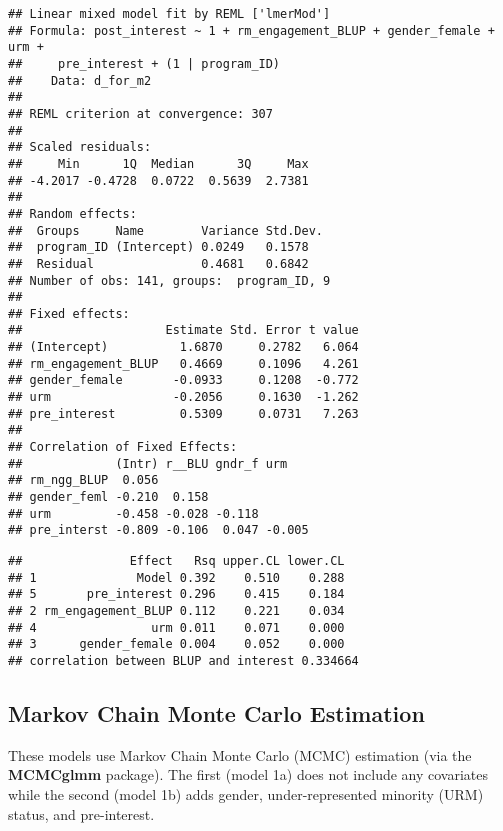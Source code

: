 \documentclass[man]{apa6}
\theoremstyle{definition}
\theoremstyle{definition}
\theoremstyle{definition}
\theoremstyle{remark}
\begin{document}
\begin{verbatim}
## Linear mixed model fit by REML ['lmerMod']
## Formula: post_interest ~ 1 + rm_engagement_BLUP + gender_female + urm +  
##     pre_interest + (1 | program_ID)
##    Data: d_for_m2
## 
## REML criterion at convergence: 307
## 
## Scaled residuals: 
##     Min      1Q  Median      3Q     Max 
## -4.2017 -0.4728  0.0722  0.5639  2.7381 
## 
## Random effects:
##  Groups     Name        Variance Std.Dev.
##  program_ID (Intercept) 0.0249   0.1578  
##  Residual               0.4681   0.6842  
## Number of obs: 141, groups:  program_ID, 9
## 
## Fixed effects:
##                    Estimate Std. Error t value
## (Intercept)          1.6870     0.2782   6.064
## rm_engagement_BLUP   0.4669     0.1096   4.261
## gender_female       -0.0933     0.1208  -0.772
## urm                 -0.2056     0.1630  -1.262
## pre_interest         0.5309     0.0731   7.263
## 
## Correlation of Fixed Effects:
##             (Intr) r__BLU gndr_f urm   
## rm_ngg_BLUP  0.056                     
## gender_feml -0.210  0.158              
## urm         -0.458 -0.028 -0.118       
## pre_interst -0.809 -0.106  0.047 -0.005
\end{verbatim}

\begin{verbatim}
##               Effect   Rsq upper.CL lower.CL
## 1              Model 0.392    0.510    0.288
## 5       pre_interest 0.296    0.415    0.184
## 2 rm_engagement_BLUP 0.112    0.221    0.034
## 4                urm 0.011    0.071    0.000
## 3      gender_female 0.004    0.052    0.000
## correlation between BLUP and interest 0.334664
\end{verbatim}

\subsection{Markov Chain Monte Carlo
Estimation}\label{markov-chain-monte-carlo-estimation}

These models use Markov Chain Monte Carlo (MCMC) estimation (via the
\textbf{MCMCglmm} package). The first (model 1a) does not include any
covariates while the second (model 1b) adds gender, under-represented
minority (URM) status, and pre-interest.
\end{document}
